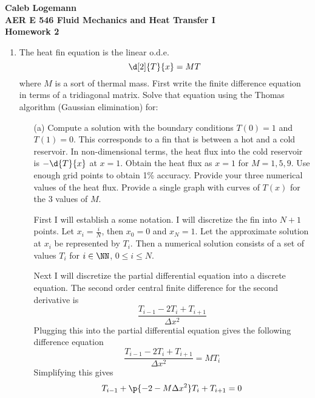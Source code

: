 \documentclass[11pt, oneside]{article}
\begin{document}
\noindent \textbf{\Large{Caleb Logemann \\
AER E 546 Fluid Mechanics and Heat Transfer I \\
Homework 2
}}

%
\begin{enumerate}
  \item %
    The heat fin equation is the linear o.d.e.
    \[
      \d[2]{T}{x} = MT
    \]
    where $M$ is a sort of thermal mass.
    First write the finite difference equation in terms of a tridiagonal matrix.
    Solve that equation using the Thomas algorithm (Gaussian elimination) for:
    \begin{enumerate}
      \item[(a)]
        Compute a solution with the boundary conditions $T(0) = 1$ and
        $T(1) = 0$.
        This corresponds to a fin that is between a hot and a cold reservoir.
        In non-dimensional terms, the heat flux into the cold reservoir is
        $-\d{T}{x}$ at $x = 1$.
        Obtain the heat flux as $x = 1$ for $M = 1, 5, 9$. Use enough grid
        points to obtain 1\% accuracy.
        Provide your three numerical values of the heat flux.
        Provide a single graph with curves of $T(x)$ for the 3 values of $M$.



        First I will establish a some notation.
        I will discretize the fin into $N + 1$ points.
        Let $x_i = \frac{i}{N}$, then $x_0 = 0$ and $x_N = 1$.
        Let the approximate solution at $x_i$ be represented by $T_i$.
        Then a numerical solution consists of a set of values $T_i$ for
        $i \in \NN$, $0 \le i \le N$.

        Next I will discretize the partial differential equation into a discrete
        equation.
        The second order central finite difference for the second derivative is
        \[
          \frac{T_{i - 1} - 2T_i + T_{i+1}}{\Delta x^2}
        \]
        Plugging this into the partial differential equation gives the following
        difference equation
        \[
          \frac{T_{i - 1} - 2T_i + T_{i+1}}{\Delta x^2} = MT_i
        \]
        Simplifying this gives
        \[
          T_{i - 1} + \p{- 2 - M\Delta x^2}T_i + T_{i+1} = 0
        \]


\end{enumerate}
\end{enumerate}
\end{document}
